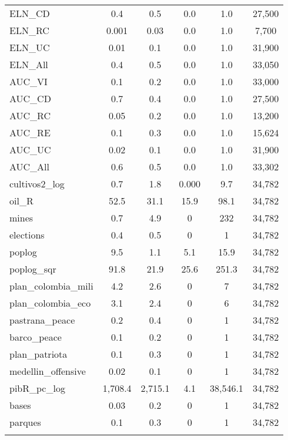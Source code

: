 \begin{table}[!htbp]
\begin{tabular}{@{\extracolsep{5pt}}lccccc}
ELN\_CD & 0.4 & 0.5 & 0.0 & 1.0 & 27,500 \\ 
ELN\_RC & 0.001 & 0.03 & 0.0 & 1.0 & 7,700 \\ 
ELN\_UC & 0.01 & 0.1 & 0.0 & 1.0 & 31,900 \\ 
ELN\_All & 0.4 & 0.5 & 0.0 & 1.0 & 33,050 \\ 
AUC\_VI & 0.1 & 0.2 & 0.0 & 1.0 & 33,000 \\ 
AUC\_CD & 0.7 & 0.4 & 0.0 & 1.0 & 27,500 \\ 
AUC\_RC & 0.05 & 0.2 & 0.0 & 1.0 & 13,200 \\ 
AUC\_RE & 0.1 & 0.3 & 0.0 & 1.0 & 15,624 \\ 
AUC\_UC & 0.02 & 0.1 & 0.0 & 1.0 & 31,900 \\ 
AUC\_All & 0.6 & 0.5 & 0.0 & 1.0 & 33,302 \\ 
cultivos2\_log & 0.7 & 1.8 & 0.000 & 9.7 & 34,782 \\ 
oil\_R & 52.5 & 31.1 & 15.9 & 98.1 & 34,782 \\ 
mines & 0.7 & 4.9 & 0 & 232 & 34,782 \\ 
elections & 0.4 & 0.5 & 0 & 1 & 34,782 \\ 
poplog & 9.5 & 1.1 & 5.1 & 15.9 & 34,782 \\ 
poplog\_sqr & 91.8 & 21.9 & 25.6 & 251.3 & 34,782 \\ 
plan\_colombia\_mili & 4.2 & 2.6 & 0 & 7 & 34,782 \\ 
plan\_colombia\_eco & 3.1 & 2.4 & 0 & 6 & 34,782 \\ 
pastrana\_peace & 0.2 & 0.4 & 0 & 1 & 34,782 \\ 
barco\_peace & 0.1 & 0.2 & 0 & 1 & 34,782 \\ 
plan\_patriota & 0.1 & 0.3 & 0 & 1 & 34,782 \\ 
medellin\_offensive & 0.02 & 0.1 & 0 & 1 & 34,782 \\ 
pibR\_pc\_log & 1,708.4 & 2,715.1 & 4.1 & 38,546.1 & 34,782 \\ 
bases & 0.03 & 0.2 & 0 & 1 & 34,782 \\ 
parques & 0.1 & 0.3 & 0 & 1 & 34,782 \\ 
\hline \\[-1.8ex] 
\end{tabular} 
\end{table} 
